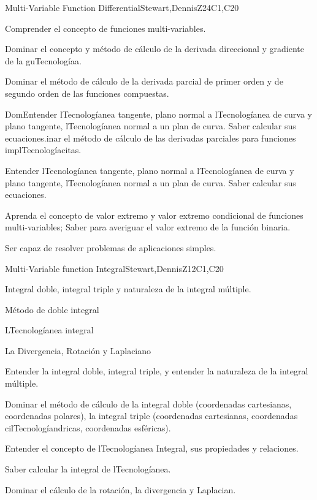 \begin{syllabus}
\begin{unit}{Multi-Variable Function Differential}{}{Stewart,DennisZ}{24}{C1,C20}
   \begin{learningoutcomes}
    \item Comprender el concepto de funciones multi-variables.
    \item Dominar el concepto y método de cálculo de la derivada direccional y gradiente de la guTecnologíaa.
    \item Dominar el método de cálculo de la derivada parcial de primer orden y de segundo orden de las funciones compuestas.
    \item DomEntender lTecnologíanea tangente, plano normal a lTecnologíanea de curva y plano tangente, lTecnologíanea normal a un plan de curva. Saber calcular sus ecuaciones.inar el método de cálculo de las derivadas parciales para funciones implTecnologíacitas.
    \item Entender lTecnologíanea tangente, plano normal a lTecnologíanea de curva y plano tangente, lTecnologíanea normal a un plan de curva. Saber calcular sus ecuaciones.
    \item Aprenda el concepto de valor extremo y valor extremo condicional de funciones multi-variables; Saber para averiguar el valor extremo de la función binaria.
    \item Ser capaz de resolver problemas de aplicaciones simples.
    \end{learningoutcomes}
\end{unit}

\begin{unit}{Multi-Variable function Integral}{}{Stewart,DennisZ}{12}{C1,C20}
  \begin{topics}
    \item Integral doble, integral triple y naturaleza de la integral múltiple.
    \item Método de doble integral
    \item LTecnologíanea integral
    \item La Divergencia, Rotación y Laplaciano
   \end{topics}
  
  \begin{learningoutcomes}
    \item Entender la integral doble, integral triple, y entender la naturaleza de la integral múltiple.
    \item Dominar el método de cálculo de la integral doble (coordenadas cartesianas, coordenadas polares), la integral triple (coordenadas cartesianas, coordenadas cilTecnologíandricas, coordenadas esféricas).
    \item Entender el concepto de lTecnologíanea Integral, sus propiedades y relaciones.
    \item Saber calcular la integral de lTecnologíanea.
    \item Dominar el cálculo de la rotación, la divergencia y Laplacian.
  

\end{learningoutcomes}
\end{unit}
\end{syllabus}
